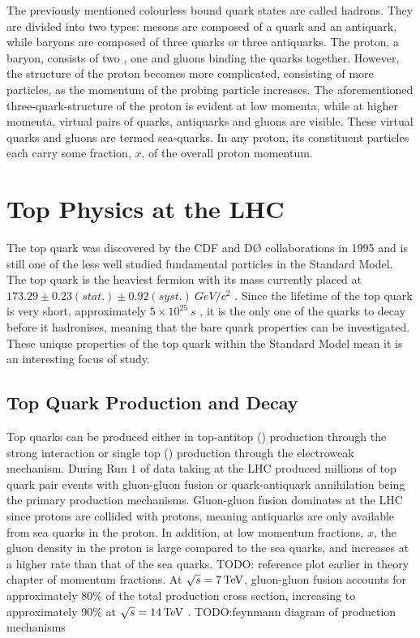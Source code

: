 The previously mentioned colourless bound quark states are called hadrons. They are divided into two types:
mesons are composed of a quark and an antiquark, while baryons are composed of three quarks or three
antiquarks. The proton, a baryon, consists of two \uquarks, one \dquark and gluons binding the quarks
together. However, the structure of the proton becomes more complicated, consisting of more particles, as the
momentum of the probing particle increases. The aforementioned three-quark-structure of the proton is evident
at low momenta, while at higher momenta, virtual pairs of quarks, antiquarks and gluons are visible. These
virtual quarks and gluons are termed sea-quarks. In any proton, its constituent particles each carry some
fraction, $x$, of the overall proton momentum. %

\section{Top Physics at the LHC}
\label{s:top_physics_at_the_lhc}
The top quark was discovered by the CDF and D{\O} collaborations in 1995 \cite{Abe:1995hr, Abachi:1995iq} and
is still one of the less well studied fundamental particles in the Standard Model. The top quark is the
heaviest fermion with its mass currently placed at $173.29 \pm 0.23 (stat.) \pm 0.92 (syst.)~GeV/c^{2}$
\cite{top_mass}. Since the lifetime of the top quark is very short, approximately $5 \times 10^{25}~s$
\cite{Agashe:2014kda}, it is the only one of the quarks to decay before it hadronises, meaning that the bare
quark properties can be investigated. These unique properties of the top quark within the Standard Model mean
it is an interesting focus of study.

\subsection{Top Quark Production and Decay}
\label{ss:top_quark_production_and_decay}
Top quarks can be produced either in top-antitop (\ttbar) production through the strong interaction or single
top (\tquark) production through the electroweak mechanism. During Run 1 of data taking at the LHC produced
millions of top quark pair events with gluon-gluon fusion or quark-antiquark annihilation being the primary
production mechanisms. Gluon-gluon fusion dominates at the LHC since protons are collided with protons,
meaning antiquarks are only available from sea quarks in the proton. In addition, at low momentum fractions,
$x$, the gluon density in the proton is large compared to the sea quarks, and increases at a higher rate than
that of the sea quarks. TODO: reference plot earlier in theory chapter of momentum fractions. %
At $\sqrt{s}=7\,\text{Te\hspace{-.08em}V}$, gluon-gluon fusion accounts for approximately 80\% of the total \tquark production cross
section, increasing to approximately 90\% at $\sqrt{s}=14\,\text{Te\hspace{-.08em}V}$ \cite{Agashe:2014kda}.
TODO:feynmann diagram of production mechanisms

